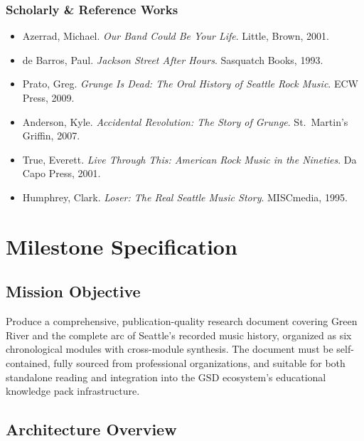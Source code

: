 \documentclass[11pt,letterpaper]{article}
\newcommand{\stageheader}[2]{%
  \noindent\colorbox{#2}{\makebox[\textwidth][l]{%
    \textcolor{white}{\bfseries\sffamily\hspace{6pt}#1\hspace{6pt}}}}%
  \vspace{0.5em}\par%
}
\begin{document}
\subsubsection{Scholarly \& Reference Works}
\begin{itemize}[nosep]
  \item Azerrad, Michael. \textit{Our Band Could Be Your Life}. Little, Brown, 2001.
  \item de Barros, Paul. \textit{Jackson Street After Hours}. Sasquatch Books, 1993.
  \item Prato, Greg. \textit{Grunge Is Dead: The Oral History of Seattle Rock Music}. ECW Press, 2009.
  \item Anderson, Kyle. \textit{Accidental Revolution: The Story of Grunge}. St.\ Martin's Griffin, 2007.
  \item True, Everett. \textit{Live Through This: American Rock Music in the Nineties}. Da Capo Press, 2001.
  \item Humphrey, Clark. \textit{Loser: The Real Seattle Music Story}. MISCmedia, 1995.
\end{itemize}

\newpage

\stageheader{STAGE 3 --- MISSION PACKAGE}{tertiary}

\section{Milestone Specification}

\subsection{Mission Objective}

Produce a comprehensive, publication-quality research document covering Green River and the complete arc of Seattle's recorded music history, organized as six chronological modules with cross-module synthesis. The document must be self-contained, fully sourced from professional organizations, and suitable for both standalone reading and integration into the GSD ecosystem's educational knowledge pack infrastructure.

\subsection{Architecture Overview}
\end{document}
